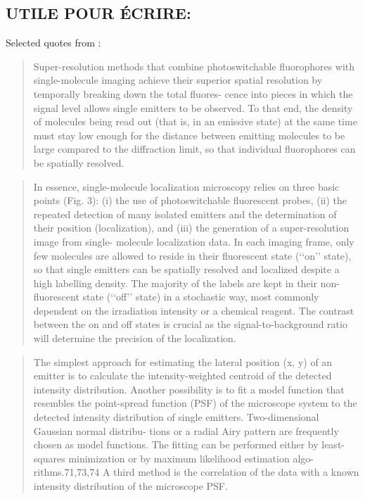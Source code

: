 \subsection{UTILE POUR ÉCRIRE:}
Selected quotes from \cite{furstenberg_single-molecule_2013}:
\begin{quote}
    Super-resolution methods that combine photoswitchable
    fluorophores with single-molecule imaging achieve their superior
    spatial resolution by temporally breaking down the total fluores-
    cence into pieces in which the signal level allows single emitters to
    be observed. To that end, the density of molecules being read out
    (that is, in an emissive state) at the same time must stay low
    enough for the distance between emitting molecules to be large
    compared to the diﬀraction limit, so that individual fluorophores
    can be spatially resolved. \cite{furstenberg_single-molecule_2013}
\end{quote}
\begin{quote}
    In essence, single-molecule localization microscopy relies on
    three basic points (Fig. 3): (i) the use of photoswitchable
    fluorescent probes, (ii) the repeated detection of many isolated
    emitters and the determination of their position (localization),
    and (iii) the generation of a super-resolution image from single-
    molecule localization data. In each imaging frame, only few
    molecules are allowed to reside in their fluorescent state
    (‘‘on’’ state), so that single emitters can be spatially resolved
    and localized despite a high labelling density. The majority of
    the labels are kept in their non-fluorescent state (‘‘oﬀ’’ state) in
    a stochastic way, most commonly dependent on the irradiation
    intensity or a chemical reagent. The contrast between the on
    and oﬀ states is crucial as the signal-to-background ratio will
    determine the precision of the localization. \cite{furstenberg_single-molecule_2013}
\end{quote}
\begin{quote}
    The simplest
    approach for estimating the lateral position (x, y) of an emitter
    is to calculate the intensity-weighted centroid of the detected
    intensity distribution. Another possibility is to fit a model
    function that resembles the point-spread function (PSF) of
    the microscope system to the detected intensity distribution
    of single emitters. Two-dimensional Gaussian normal distribu-
    tions or a radial Airy pattern are frequently chosen as model
    functions. The fitting can be performed either by least-squares
    minimization or by maximum likelihood estimation algo-
    rithms.71,73,74 A third method is the correlation of the data
    with a known intensity distribution of the microscope PSF. \cite{furstenberg_single-molecule_2013}
\end{quote}